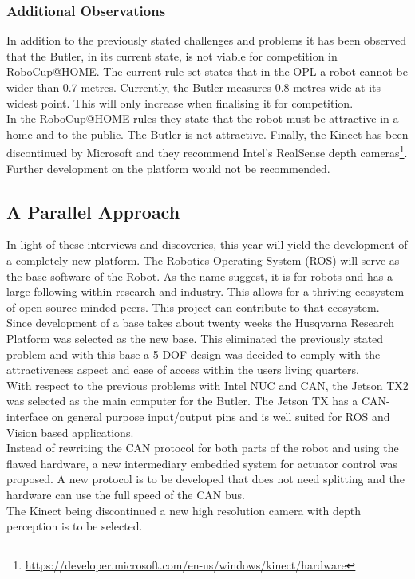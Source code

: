 \subsubsection{Additional Observations}
In addition to the previously stated challenges and problems it has been observed that the Butler, in its current state, is not viable for competition in RoboCup@HOME. The current rule-set states that in the OPL a robot cannot be wider than 0.7 metres\cite{robocup-rulebook}. Currently, the Butler measures 0.8 metres wide at its widest point. This will only increase when finalising it for competition.\\
\indent In the RoboCup@HOME rules they state that the robot must be attractive in a home and to the public. The Butler is not attractive. Finally, the Kinect has been discontinued by Microsoft and they recommend Intel's RealSense depth cameras\footnote{\url{https://developer.microsoft.com/en-us/windows/kinect/hardware}}. Further development on the platform would not be recommended.

\subsection{A Parallel Approach}
In light of these interviews and discoveries, this year will yield the development of a completely new platform. The Robotics Operating System (ROS) will serve as the base software of the Robot. As the name suggest, it is for robots and has a large following within research and industry. This allows for a thriving ecosystem of open source minded peers. This project can contribute to that ecosystem.\\
\indent Since development of a base takes about twenty weeks the Husqvarna Research Platform was selected as the new base. This eliminated the previously stated problem and with this base a 5-DOF design was decided to comply with the attractiveness aspect and ease of access within the users living quarters. \\
\indent With respect to the previous problems with Intel NUC and CAN, the Jetson TX2 was selected as the main computer for the Butler. The Jetson TX has a CAN-interface on general purpose input/output pins and is well suited for ROS and Vision based applications.\\
\indent Instead of rewriting the CAN protocol for both parts of the robot and using the flawed hardware, a new intermediary embedded system for actuator control was proposed. A new protocol is to be developed that does not need splitting and the hardware can use the full speed of the CAN bus. \\
\indent The Kinect being discontinued a new high resolution camera with depth perception is to be selected.

